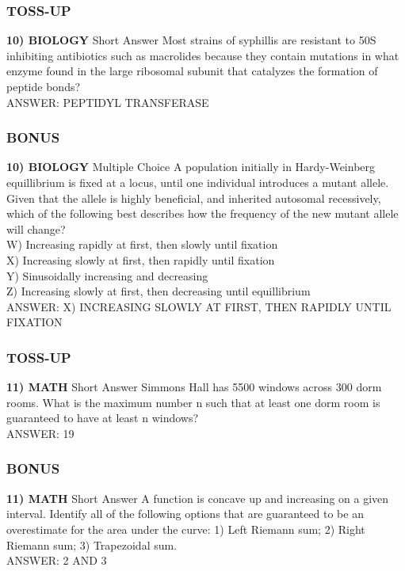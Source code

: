 \newpage

\subsubsection*{TOSS-UP}
\textbf{10) BIOLOGY}
Short Answer Most strains of syphillis are resistant to 50S inhibiting antibiotics such as macrolides because they contain mutations in what enzyme found in the large ribosomal subunit that catalyzes the formation of peptide bonds?
\\ANSWER: PEPTIDYL TRANSFERASE

\subsubsection*{BONUS}
\textbf{10) BIOLOGY}
Multiple Choice A population initially in Hardy-Weinberg equillibrium is fixed at a locus, until one individual introduces a mutant allele. Given that the allele is highly beneficial, and inherited autosomal recessively, which of the following best describes how the frequency of the new mutant allele will change?
\\W) Increasing rapidly at first, then slowly until fixation
\\X) Increasing slowly at first, then rapidly until fixation
\\Y) Sinusoidally increasing and decreasing
\\Z) Increasing slowly at first, then decreasing until equillibrium
\\ANSWER: X) INCREASING SLOWLY AT FIRST, THEN RAPIDLY UNTIL FIXATION

\subsubsection*{TOSS-UP}
\textbf{11) MATH}
Short Answer Simmons Hall has 5500 windows across 300 dorm rooms. What is the maximum number n such that at least one dorm room is guaranteed to have at least n windows?
\\ANSWER: 19

\subsubsection*{BONUS}
\textbf{11) MATH}
Short Answer A function is concave up and increasing on a given interval. Identify all of the following options that are guaranteed to be an overestimate for the area under the curve: 1) Left Riemann sum; 2) Right Riemann sum; 3) Trapezoidal sum.
\\ANSWER: 2 AND 3

